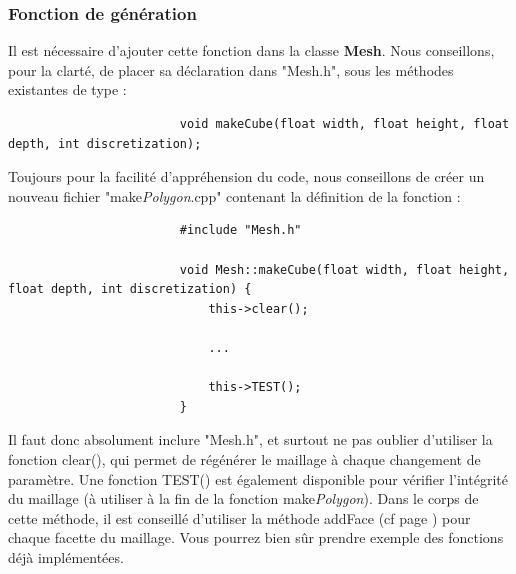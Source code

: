 \documentclass[a4paper]{memoir}
\begin{document}
				\subsubsection{Fonction de génération}
					Il est nécessaire d'ajouter cette fonction dans la classe \textbf{Mesh}. Nous conseillons, pour la clarté, de placer sa déclaration dans 
					"Mesh.h", sous les méthodes existantes de type :
					\begin{verbatim}
						void makeCube(float width, float height, float depth, int discretization);
					\end{verbatim}
					Toujours pour la facilité d'appréhension du code, nous conseillons de créer un nouveau fichier "make\textit{Polygon}.cpp" contenant la 
					définition de la fonction :
					\begin{verbatim}
						#include "Mesh.h"

						void Mesh::makeCube(float width, float height, float depth, int discretization) {
						    this->clear();
							
						    ...
							
						    this->TEST();
						}
					\end{verbatim}
					Il faut donc absolument inclure "Mesh.h", et surtout ne pas oublier d'utiliser la fonction clear(), qui permet de régénérer le maillage à
					chaque changement de paramètre. Une fonction TEST() est également disponible pour vérifier l'intégrité du maillage (à utiliser à la fin 
					de la fonction make\textit{Polygon}). Dans le corps de cette méthode, il est conseillé d'utiliser la méthode addFace (cf page 
					\pageref{mesh-dev}) pour chaque facette du maillage. Vous pourrez bien sûr prendre exemple des fonctions déjà implémentées.
					
\end{document}
